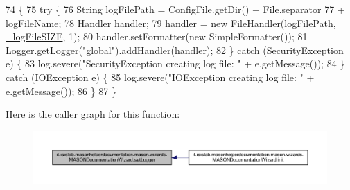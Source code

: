 \begin{DoxyCode}
74                              \{
75         \textcolor{keywordflow}{try} \{
76             String logFilePath = ConfigFile.getDir() + File.separator
77                     + \hyperlink{classit_1_1isislab_1_1masonhelperdocumentation_1_1mason_1_1wizards_1_1_m_a_s_o_n_documentation_wizard_a8cff8f361185fdae7ef6d181e2bef353}{logFileName};
78             Handler handler;
79             handler = \textcolor{keyword}{new} FileHandler(logFilePath, \hyperlink{classit_1_1isislab_1_1masonhelperdocumentation_1_1mason_1_1wizards_1_1_m_a_s_o_n_documentation_wizard_aceaf93376094874691a1eb188e8b3185}{\_logFileSIZE}, 1);
80             handler.setFormatter(\textcolor{keyword}{new} SimpleFormatter());
81             Logger.getLogger(\textcolor{stringliteral}{"global"}).addHandler(handler);
82         \} \textcolor{keywordflow}{catch} (SecurityException e) \{
83             log.severe(\textcolor{stringliteral}{"SecurityException creating log file: "} + e.getMessage());
84         \} \textcolor{keywordflow}{catch} (IOException e) \{
85             log.severe(\textcolor{stringliteral}{"IOException creating log file: "} + e.getMessage());
86         \}
87     \}
\end{DoxyCode}


Here is the caller graph for this function\-:
\nopagebreak
\begin{figure}[H]
\begin{center}
\leavevmode
\includegraphics[width=350pt]{classit_1_1isislab_1_1masonhelperdocumentation_1_1mason_1_1wizards_1_1_m_a_s_o_n_documentation_wizard_af1edd4add23bbf210945e1506c9ce018_icgraph}
\end{center}
\end{figure}





